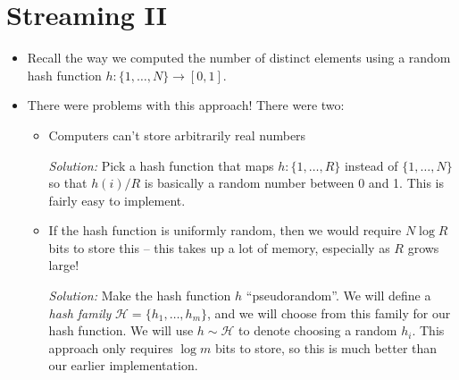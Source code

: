 \section{Streaming II}
\begin{itemize}
	\item Recall the way we computed the number of distinct elements 
		using a random hash function \( h: \{1, \dots, N\} \to [0, 1] \). 
	\item There were problems with this approach! There were two:
		\begin{itemize}
			\item Computers can't store arbitrarily real numbers

				\textit{Solution:} Pick a hash function that maps \( h: \{1, \dots, R\}  \) instead of 
				\( \{1, \dots, N\}  \) so that \( h(i) / R \) is basically a random number between 0 and 1. This 
				is fairly easy to implement.
			\item If the hash function is uniformly random, then we would require \( N \log R \) bits to 
				store this -- this takes up a lot of memory, especially as \( R \) grows large! 

				\textit{Solution:} Make the hash function \( h \) ``pseudorandom''. We will define 
				a \textit{hash family} \( \mathcal H = \{h_1, \dots, h_m\}  \), and we will choose from this 
				family for our hash function. We will use \( h \sim \mathcal H \) to denote choosing a random 
				\( h_i \). This approach only requires \( \log m \) bits to store, so this is much better
				than our earlier implementation. 



		\end{itemize}
\end{itemize}
